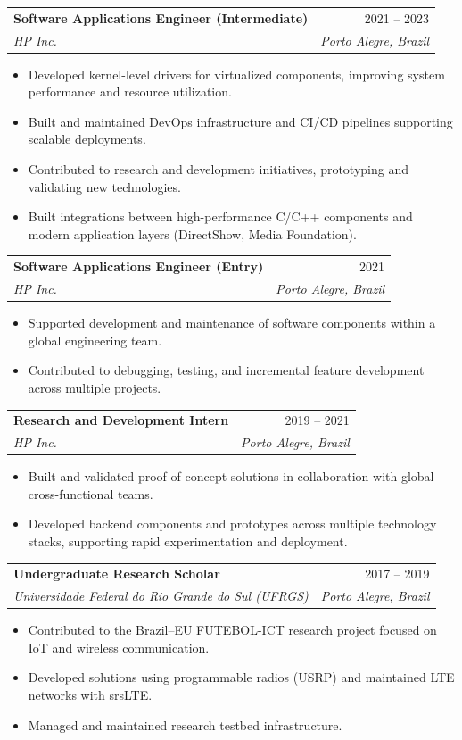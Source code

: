 \documentclass[letterpaper,10pt]{article}
\makeatletter
\newcommand{\resumeSubheading}[4]{
  \vspace{-1pt}\item
    \begin{tabular*}{0.97\textwidth}{l@{\extracolsep{\fill}}r}
      \textbf{#1} & #2 \\
      \textit{\small#3} & \textit{\small #4} \\
    \end{tabular*}\vspace{-5pt}
}
\makeatother
\begin{document}
  \resumeSubheading
    {Software Applications Engineer (Intermediate)}{2021 -- 2023}
    {HP Inc.}{Porto Alegre, Brazil}
    \begin{itemize}
      \item Developed kernel-level drivers for virtualized components, improving system performance and resource utilization.
      \item Built and maintained DevOps infrastructure and CI/CD pipelines supporting scalable deployments.
      \item Contributed to research and development initiatives, prototyping and validating new technologies.
      \item Built integrations between high-performance C/C++ components and modern application layers (DirectShow, Media Foundation).
    \end{itemize}

  \resumeSubheading
    {Software Applications Engineer (Entry)}{2021}
    {HP Inc.}{Porto Alegre, Brazil}
    \begin{itemize}
      \item Supported development and maintenance of software components within a global engineering team.
      \item Contributed to debugging, testing, and incremental feature development across multiple projects.
    \end{itemize}

  \resumeSubheading
    {Research and Development Intern}{2019 -- 2021}
    {HP Inc.}{Porto Alegre, Brazil}
    \begin{itemize}
      \item Built and validated proof-of-concept solutions in collaboration with global cross-functional teams.
      \item Developed backend components and prototypes across multiple technology stacks, supporting rapid experimentation and deployment.
    \end{itemize}

  \resumeSubheading
    {Undergraduate Research Scholar}{2017 -- 2019}
    {Universidade Federal do Rio Grande do Sul (UFRGS)}{Porto Alegre, Brazil}
    \begin{itemize}
      \item Contributed to the Brazil--EU FUTEBOL-ICT research project focused on IoT and wireless communication.
      \item Developed solutions using programmable radios (USRP) and maintained LTE networks with srsLTE.
      \item Managed and maintained research testbed infrastructure.
    \end{itemize}
\end{document}
